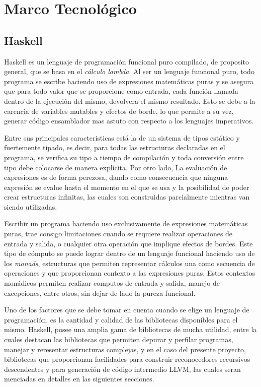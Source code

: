 \chapter{Marco Tecnológico}
\label{capitulo2}

\section{Haskell}
Haskell es un lenguaje de programación funcional puro compilado, de proposito
general, que se basa en el \textit{cálculo lambda}. Al ser un lenguaje
funcional puro, todo programa se escribe haciendo uso de expresiones
matemáticas puras y se asegura que para todo valor que se proporcione como
entrada, cada función llamada dentro de la ejecución del mismo, devolvera el
mismo resultado. Esto se debe a la carencia de variables mutables y efectos de
borde, lo que permite a su vez, generar código ensamblador mas astuto con
respecto a los lenguajes imperativos.

Entre sus principales caracteristicas está la de un sistema de tipos estático
y fuertemente tipado, es decir, para todas las estructuras declaradas en el
programa, se verifica su tipo a tiempo de compilación y toda conversión entre
tipo debe colocarse de manera explícita. Por otro lado, La evaluación de
expresiones es de forma perezosa, dando como consecuencia que ninguna
expresión se evalue hasta el momento en el que se usa y la posibilidad de
poder crear estructuras infinitas, las cuales son construidas parcialmente
mientras van siendo utilizadas.

Escribir un programa haciendo uso exclusivamente de expresiones matemáticas
puras, trae consigo limitaciones cuando se requiere realizar operaciones de
entrada y salida, o cualquier otra operación que implique efectos de bordes.
Este tipo de cómputo se puede lograr dentro de un lenguaje funcional haciendo
uso de los \textit{monads}, estructuras que permiten representar cálculos una
como secuencia de operaciones y que proporcionan contexto a las expresiones
puras. Estos contextos monádicos permiten realizar computos de entrada y
salida, manejo de excepciones, entre otros, sin dejar de lado la pureza
funcional.

Uno de los factores que se debe tomar en cuenta cuando se elige un lenguaje de
programación, es la cantidad y calidad de las bibliotecas disponibles para el
mismo. Haskell, posee una amplia gama de bibliotecas de mucha utilidad, entre la
cuales destacan las bibliotecas que permiten depurar y perfilar programas,
manejar y reresentar estructuras complejas, y en el caso del presente
proyecto, bibliotecas que proporcionan facilidades para construir reconocedores
recursivos descendentes y para generación de código intermedio LLVM, las
cuales seran menciadas en detalles en las siguientes secciones.

